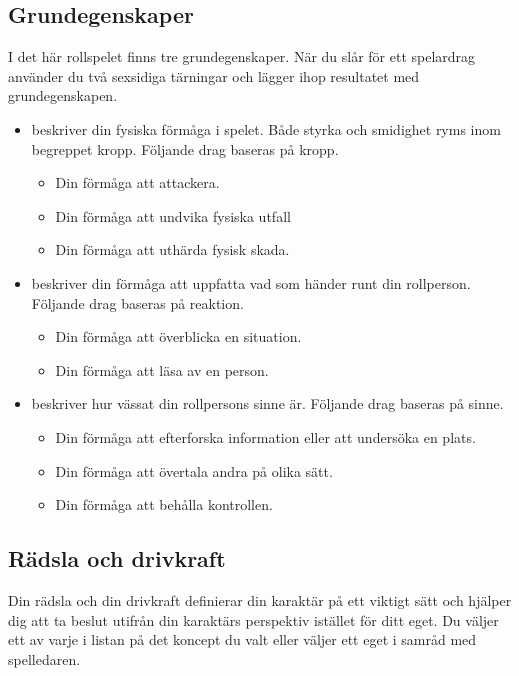 \documentclass[a5paper,10pt]{article}
\begin{document}
\subsection{Grundegenskaper}
I det här rollspelet finns tre grundegenskaper. När du slår för ett spelardrag använder du två sexsidiga tärningar och lägger ihop resultatet med grundegenskapen.
\begin{itemize}
  \item {} beskriver din fysiska förmåga i spelet. Både styrka och smidighet ryms inom begreppet kropp. Följande drag baseras på kropp.
  \begin{itemize}
    \item Din förmåga att attackera.
    \item Din förmåga att undvika fysiska utfall
    \item Din förmåga att uthärda fysisk skada.
  \end{itemize}
  \item {} beskriver din förmåga att uppfatta vad som händer runt din rollperson. Följande drag baseras på reaktion.
  \begin{itemize}
    \item Din förmåga att överblicka en situation.
    \item Din förmåga att läsa av en person.
  \end{itemize}
  \item {} beskriver hur vässat din rollpersons sinne är. Följande drag baseras på sinne.
  \begin{itemize}
    \item Din förmåga att efterforska information eller att undersöka en plats.
    \item Din förmåga att övertala andra på olika sätt.
    \item Din förmåga att behålla kontrollen.
  \end{itemize}
\end{itemize}
\subsection{Rädsla och drivkraft}
Din rädsla och din drivkraft definierar din karaktär på ett viktigt sätt och hjälper dig att ta beslut utifrån din karaktärs perspektiv istället för ditt eget.
Du väljer ett av varje i listan på det koncept du valt eller väljer ett eget i samråd med spelledaren.
\end{document}
